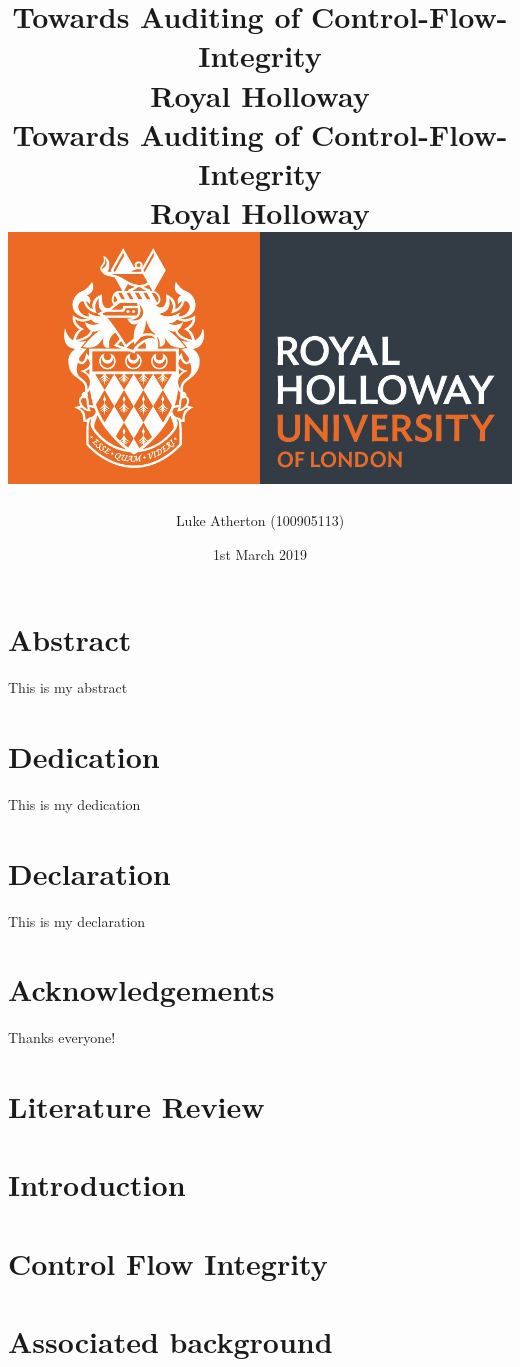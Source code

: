 \documentclass[10pt]{report}
\title{
	{Towards Auditing of Control-Flow-Integrity}\\
	{\large Royal Holloway}\\
}
\title{
	{Towards Auditing of Control-Flow-Integrity}\\
	{\large Royal Holloway}\\
	{\includegraphics[scale=0.5]{royalholloway.jpg}}
}
\author{Luke Atherton (100905113)}
\date{1st March 2019}
\newif\iflitreview
\begin{document}
\maketitle

\iflitreview

\else

\chapter*{Abstract}
This is my abstract

\chapter*{Dedication}
This is my dedication

\chapter*{Declaration}
This is my declaration

\chapter*{Acknowledgements}
Thanks everyone!

\fi

\tableofcontents

\iflitreview

\chapter{Literature Review}

\else

\chapter{Introduction}







\chapter{Control Flow Integrity}


\chapter{Associated background}




\end{document}
